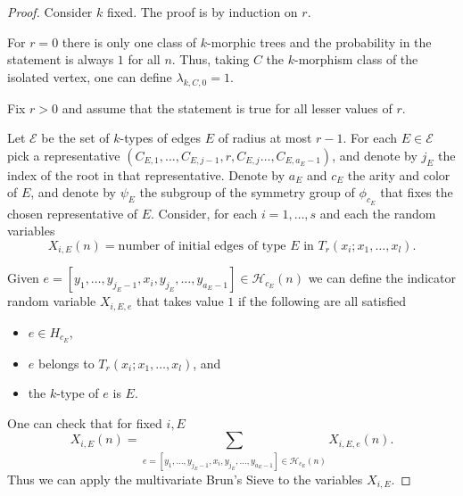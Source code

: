 \documentclass[11pt,notitlepage]{report}
\theoremstyle{definition}
\newcommand{\Ln}{\lim\limits_{n\to \infty}}
\begin{document}
\begin{proof}
Consider $k$ fixed.
The proof is by induction on $r$. 

	\item For $r=0$ there is only one class
	of $k$-morphic trees and the probability in 
	the statement is always $1$ for all $n$.
	Thus, taking $C$ the $k$-morphism class of the isolated
	vertex, one can define $\lambda_{k,C,0}=1$. 
	\item Fix $r>0$ and assume that the statement
	is true for all lesser values of $r$. \par
	Let $\mathcal{E}$ be the set of $k$-types of edges $E$ of
	radius at most $r-1$. For each $E\in \mathcal{E}$
	pick a representative
	$( C_{E,1}, \dots, C_{E,j-1}, r, C_{E,j}\dots, C_{E,a_E-1})$, 
	and denote by $j_E$ the index of the root in that representative. 
	Denote by $a_E$ and $c_E$ the arity and color of $E$, and 
	denote by $\psi_E$ the subgroup of the symmetry group of $\phi_{c_E}$ 
	that fixes the chosen representative of $E$.
	Consider, for each $i=1,\dots, s$ and each the random variables 
	\[X_{i,E}(n)= \text{number of initial edges of type }E \text{ in } 
	T_r(x_i;x_1, \dots, x_l). \]
	
	Given $e=[y_1,\dots,y_{j_E-1},x_i, y_{j_E},\dots ,y_{a_E-1}]\in \mathcal{H}_{c_E}(n)$ we can define the indicator 
	random variable $X_{i,E,e}$ that takes value $1$ if the following are 
	all satisfied
	\begin{itemize}
		\item $e\in H_{c_E}$,
		\item $e$ belongs to $T_r(x_i;x_1, \dots, x_l)$, and
		\item the $k$-type of $e$ is $E$. 	
	\end{itemize} 
	One can check that for fixed $i, E$
	\[X_{i,E}(n)= \sum_{e=[y_1,\dots,y_{j_E-1},x_i,y_{j_E},
	\dots ,y_{a_E-1}]\in \mathcal{H}_{c_E}(n)} X_{i,E,e}(n).\]
	Thus we can apply the multivariate Brun's Sieve to the variables 
	$X_{i, E}$.\par
	

\end{proof}
\end{document}
